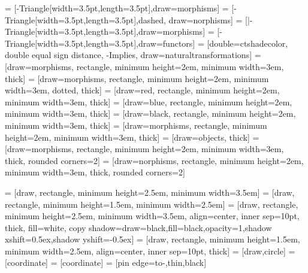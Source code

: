 \usepackage{tikz}


\usetikzlibrary{positioning,
  intersections,
  hobby,
  patterns,
  calc,
  decorations.pathmorphing,
  decorations.markings,
  shadows,
  shapes,
  cd,
  decorations.markings,
  positioning,
  arrows.meta,
  shapes,
  calc,
  fit,
  quotes,
backgrounds}

\usepackage{tikzpagenodes}


 = [-{Triangle[width=3.5pt,length=3.5pt]},draw=morphisms]
 = [-{Triangle[width=3.5pt,length=3.5pt]},dashed, draw=norphisms]
 = [|-{Triangle[width=3.5pt,length=3.5pt]},draw=morphisms]
 = [-{Triangle[width=3.5pt,length=3.5pt]},draw=functors]
 = [double=ctshadecolor, double equal sign distance, -{Implies}, draw=naturaltransformations]
 = [draw=morphisms, rectangle, minimum height=2em, minimum width=3em, thick]
 = [draw=morphisms, rectangle, minimum height=2em, minimum width=3em, dotted, thick]
 = [draw=red, rectangle, minimum height=2em, minimum width=3em, thick]
 = [draw=blue, rectangle, minimum height=2em, minimum width=3em, thick]
 = [draw=black, rectangle, minimum height=2em, minimum width=3em, thick]
 = [draw=morphisms, rectangle, minimum height=2em, minimum width=3em, thick]
 = [draw=objects, thick]
 = [draw=morphisms, rectangle, minimum height=2em, minimum width=3em, thick, rounded corners=2]
 = [draw=norphisms, rectangle, minimum height=2em, minimum width=3em, thick, rounded corners=2]

 = [draw, rectangle, minimum height=2.5em, minimum width=3.5em]
 = [draw, rectangle, minimum height=1.5em, minimum width=2.5em]
 = [draw, rectangle, minimum height=2.5em, minimum width=3.5em, align=center, inner sep=10pt, thick, fill=white, copy shadow={draw=black,fill=black,opacity=1,shadow xshift=0.5ex,shadow yshift=-0.5ex}]
 = [draw, rectangle, minimum height=1.5em, minimum width=2.5em, align=center, inner sep=10pt, thick]
 = [draw,circle]
 = [coordinate]
 = [coordinate]
 = [pin edge={to-,thin,black}]

